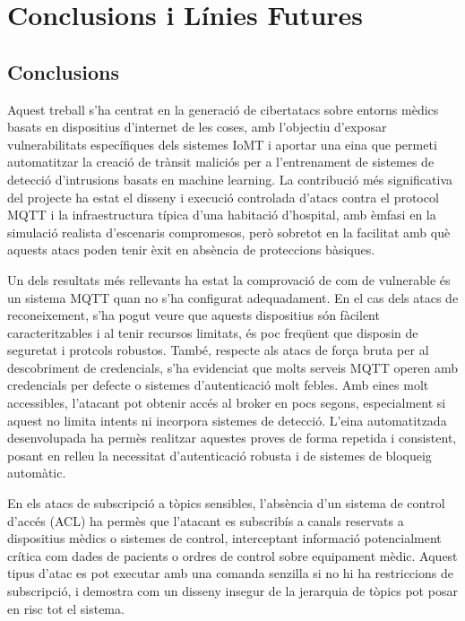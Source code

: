 
\chapter{Conclusions i Línies Futures}

\section{Conclusions}
Aquest treball s’ha centrat en la generació de cibertatacs sobre entorns mèdics basats en dispositius d'internet de les coses, amb l’objectiu d’exposar vulnerabilitats específiques dels sistemes IoMT i aportar una eina que permeti automatitzar la creació de trànsit maliciós per a l’entrenament de sistemes de detecció d’intrusions basats en machine learning. La contribució més significativa del projecte ha estat el disseny i execució controlada d’atacs contra el protocol MQTT i la infraestructura típica d'una habitació d'hospital, amb èmfasi en la simulació realista d’escenaris compromesos, però sobretot en la facilitat amb què aquests atacs poden tenir èxit en absència de proteccions bàsiques.

Un dels resultats més rellevants ha estat la comprovació de com de vulnerable és un sistema MQTT quan no s’ha configurat adequadament. En el cas dels atacs de reconeixement, s'ha pogut veure que aquests dispositius són fàcilent caracteritzables i al tenir recursos limitats, és poc freqüent que disposin de seguretat i protcols robustos. També, respecte als atacs de força bruta per al descobriment de credencials, s’ha evidenciat que molts serveis MQTT operen amb credencials per defecte o sistemes d’autenticació molt febles. Amb eines molt accessibles, l’atacant pot obtenir accés al broker en pocs segons, especialment si aquest no limita intents ni incorpora sistemes de detecció. L’eina automatitzada desenvolupada ha permès realitzar aquestes proves de forma repetida i consistent, posant en relleu la necessitat d’autenticació robusta i de sistemes de bloqueig automàtic.

En els atacs de subscripció a tòpics sensibles, l’absència d’un sistema de control d’accés (ACL) ha permès que l’atacant es subscribís a canals reservats a dispositius mèdics o sistemes de control, interceptant informació potencialment crítica com dades de pacients o ordres de control sobre equipament mèdic. Aquest tipus d’atac es pot executar amb una comanda senzilla si no hi ha restriccions de subscripció, i demostra com un disseny insegur de la jerarquia de tòpics pot posar en risc tot el sistema.

